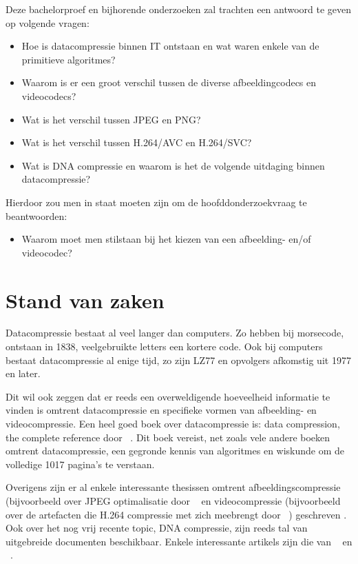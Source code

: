 Deze bachelorproef en bijhorende onderzoeken zal trachten een antwoord te geven op volgende vragen: 
\begin{itemize}
    \item{Hoe is datacompressie binnen IT ontstaan en wat waren enkele van de primitieve algoritmes?}
     \item{Waarom is er een groot verschil tussen de diverse afbeeldingcodecs en videocodecs?}
     \item{Wat is het verschil tussen JPEG en PNG?}
      \item{Wat is het verschil tussen H.264/AVC en H.264/SVC?}
      \item{Wat is DNA compressie en waarom is het de volgende uitdaging binnen datacompressie?}
\end{itemize}
Hierdoor zou men in staat moeten zijn om de hoofddonderzoekvraag te beantwoorden:  
\begin{itemize}
    \item{Waarom moet men stilstaan bij het kiezen van een afbeelding- en/of videocodec?}
\end{itemize}

\section{Stand van zaken}
\label{sec:stand-van-zaken}

Datacompressie bestaat al veel langer dan computers. Zo hebben bij morsecode, ontstaan in 1838, veelgebruikte letters een kortere code. Ook bij computers bestaat datacompressie al enige tijd, zo zijn LZ77 en opvolgers afkomstig uit 1977 en later. \autocite{Riha2011} 

Dit wil ook zeggen dat er reeds een overweldigende hoeveelheid informatie te vinden is omtrent datacompressie en specifieke vormen van afbeelding- en videocompressie. Een heel goed boek over datacompressie is: data compression, the complete reference door  ~\textcite{Salomon2006}. Dit boek vereist, net zoals vele andere boeken omtrent datacompressie,  een gegronde kennis van algoritmes en wiskunde om de volledige 1017 pagina's te verstaan.

Overigens zijn er al enkele interessante thesissen omtrent afbeeldingscompressie (bijvoorbeeld over JPEG optimalisatie door ~\textcite{Wahlstrom2015} en videocompressie (bijvoorbeeld over de artefacten die H.264 compressie met zich meebrengt door  ~\textcite{Rakesh2013}) geschreven . Ook over het nog vrij recente topic, DNA compressie, zijn reeds tal van uitgebreide documenten beschikbaar. Enkele interessante artikels zijn die van ~\textcite{Afify2011} en ~\textcite{Kuruppu2012}. 

